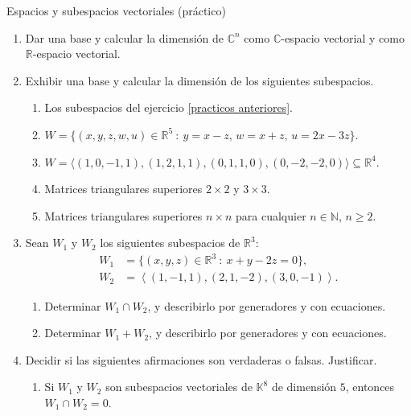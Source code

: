 \begin{chapter}{Espacios y subespacios vectoriales (práctico)}
\begin{enumerate}[resume, topsep=6pt, itemsep=.4cm]
\item Dar una base y calcular la dimensión de $\mathbb{C}^n$ como $\mathbb{C}$-espacio vectorial y como $\mathbb{R}$-espacio vectorial.


\item  Exhibir una base y calcular la dimensión de los siguientes subespacios.

 \begin{enumerate}
    \item Los subespacios del ejercicio \ref{practicos anteriores}.
    \item $W = \{(x,y,z,w,u) \in \mathbb{R}^5 \ : \ y = x - z,\, w = x + z,\,  u = 2x - 3z \}$.
    \item $W = \langle (1, 0, -1, 1),  (1, 2, 1, 1), (0, 1, 1, 0), (0, -2, -2, 0) \rangle \subseteq \mathbb R^4$.
    \item Matrices triangulares superiores $2\times 2$ y $3\times 3$.
    \item Matrices triangulares superiores $n\times n$ para cualquier $n\in\mathbb{N}$, $n\geq 2$.
\end{enumerate}

\item Sean $W_1$ y $W_2$ los siguientes subespacios de $\mathbb{R}^3$:
    \begin{align*}
    W_1 &= \{ (x,y,z)\in\mathbb{R}^3\ : \ x+y-2z=0\},  \\
    W_2 &= {\left\langle(1,-1,1),(2,1,-2),(3,0,-1)\right\rangle}.
    \end{align*}
    \begin{enumerate}
        \item  Determinar $W_1 \cap W_2$, y describirlo por generadores y con ecuaciones.
        \item  Determinar $W_1+W_2$, y describirlo por generadores y con ecuaciones.
    \end{enumerate}


\item\label{verdadero o falso} Decidir si las siguientes afirmaciones son verdaderas o falsas. Justificar.

\begin{enumerate}
 \item Si $W_1$ y $W_2$ son subespacios vectoriales de $\mathbb{K}^8$ de dimensión $5$, entonces $W_1\cap W_2=0$.


\end{enumerate}
\end{enumerate}
\end{chapter}
